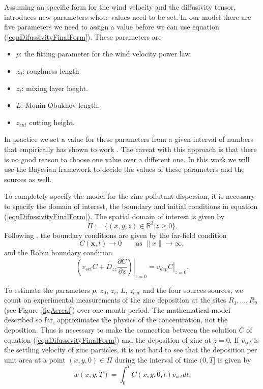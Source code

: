 \documentclass[12pt]{book}
\newcommand{\x}{\textbf{x}}
\begin{document}
Assuming an specific form for the wind velocity and the  
diffusivity tensor, introduces new parameters whose values need to be set. In our model
there are five parameters we need to assign a value before we can use equation (\ref{eqnDifussivityFinalForm}).
These parameters are
\begin{itemize}
\item $p$: the fitting parameter for the wind velocity power law.
\item $z_{0}$: roughness length
\item $z_{i}$: mixing layer height.
\item $L$: Monin-Obukhov length.
\item $z_{cut}$ cutting height.
\end{itemize}
In practice we set a value for these parameters from a given interval of numbers
that empirically has shown to work \cite{seinfeld1998atmospheric,hosseini2016airborne}.
The caveat with this approach is that there is no good reason to choose one value
over a different one. In this work we will  use the Bayesian framework
to decide the values of these parameters and the sources as well.

To completely specify the model for the zinc pollutant dispersion, it is necessary to specify the domain of interest, 
the   boundary and initial  conditions in equation (\ref{eqnDifussivityFinalForm}).
The spatial domain of interest is given by
\begin{equation*}
\Pi:=\{(x,y,z)\in\mathbb{R}^{3}|z\geq 0\}.
\end{equation*}
Following \cite{hosseini2016airborne}, the boundary conditions are given by the far-field condition
\begin{equation*}
C(\x,t)\rightarrow 0\qquad\text{as   }\|x\|\rightarrow\infty,
\end{equation*}
and the Robin boundary condition
\begin{equation}\label{eqnRobinBoundary}
\left.\left(v_{set}C+D_{zz}\frac{\partial C}{\partial z}\right)\right\rvert_{z=0}=\left.v_{dep}C\right\rvert_{z=0}.
\end{equation} 
\newline

To estimate the parameters $p$, $z_{0}$, $z_{i}$, $L$, $z_{cut}$  and  the four sources sources, we count on  experimental measurements 
of the zinc deposition at the sites 
$R_{1},\ldots,R_{9}$ (see Figure \ref{figAereal}) over one month period. The mathematical model described so far,
approximates the physics of the 
concentration, not the deposition. Thus is necessary to make the connection between the solution $C$ of equation (\ref{eqnDifussivityFinalForm})
and the deposition of zinc at $z=0$. If $v_{set}$ is the settling velocity of zinc particles,
it is not hard to see that the deposition per unit area at a point $(x,y,0)\in\Pi$ during the interval of time $(0,T]$ is given by
\begin{equation}\label{eqnw}
w(x,y,T)=\int_{0}^{T}C(x,y,0,t)v_{set}dt.
\end{equation}
\end{document}
